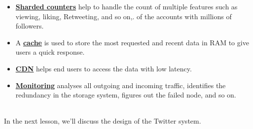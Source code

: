 \begin{itemize}
\protect{}\label{vdNUfz8lFB04zkyH0D70H}
\href{https://www.educative.io/courses/grokking-the-system-design-interview/system-design-the-pub-sub-abstraction}{\textbf{Pub-sub}} is used for real-time processing such as elimination of redundant data, organizing data, and much more.
\item
\protect{}\label{wW3A_FfnDie6oACdUtI_w}
\href{https://www.educative.io/courses/grokking-the-system-design-interview/system-design-the-sharded-counters}{\textbf{Sharded counters}} help to handle the count of multiple features such as viewing, liking, Retweeting, and so on,. of the accounts with millions of followers.
\item
\protect{}\label{CDy1lAqNt5ruD2Ah65lvU}
A \href{https://www.educative.io/courses/grokking-the-system-design-interview/system-design-the-distributed-cache}{\textbf{cache}} is used to store the most requested and recent data in RAM to give users a quick response.
\item
\protect{}\label{wSixINeMCJilLZSiUAOpm}
\href{https://www.educative.io/courses/grokking-the-system-design-interview/system-design-the-content-delivery-network-cdn}{\textbf{CDN}} helps end users to access the data with low latency.
\item
\protect{}\label{HRxTAprhgEy8jIDqP1Mob}
\href{https://www.educative.io/courses/grokking-the-system-design-interview/system-design-distributed-monitoring}{\textbf{Monitoring}} analyses all outgoing and incoming traffic, identifies the redundancy in the storage system, figures out the failed node, and so on.
\end{itemize}
\\
In the next lesson, we'll discuss the design of the Twitter system.

